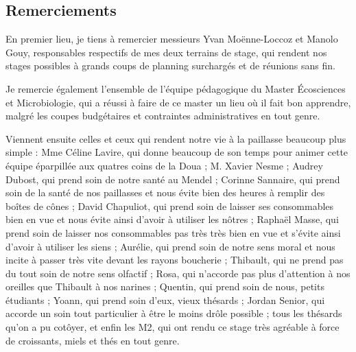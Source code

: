 \rmfamily
{}


\subsection*{Remerciements}


En premier lieu, je tiens à remercier messieurs Yvan Moënne-Loccoz et Manolo
Gouy, responsables respectifs de mes deux terrains de stage, qui rendent nos
stages possibles à grands coups de planning surchargés et de réunions sans fin.

Je remercie également l'ensemble de l'équipe pédagogique du Master Écosciences
et Microbiologie, qui a réussi à faire de ce master un lieu où il fait bon
apprendre, malgré les coupes budgétaires et contraintes administratives en tout
genre.

Viennent ensuite celles et ceux qui rendent notre vie à la paillasse beaucoup
plus simple : Mme Céline Lavire, qui donne beaucoup de son temps pour animer
cette équipe éparpillée aux quatres coins de la Doua ; M. Xavier Nesme ; Audrey
Dubost, qui prend soin de notre santé au Mendel ; Corinne Sannaire, qui prend
soin de la santé de nos paillasses et nous évite bien des heures à remplir des
boîtes de cônes ; David Chapuliot, qui prend soin de laisser ses consommables
bien en vue et nous évite ainsi d'avoir à utiliser les nôtres ; Raphaël Masse,
qui prend soin de laisser nos consommables pas très très bien en vue et s'évite
ainsi d'avoir à utiliser les siens ; Aurélie, qui prend soin de notre sens moral
et nous incite à passer très vite devant les rayons boucherie ; Thibault, qui ne
prend pas du tout soin de notre sens olfactif ; Rosa, qui n'accorde pas plus
d'attention à nos oreilles que Thibault à nos narines ; Quentin, qui prend soin
de nous, petits étudiants ; Yoann, qui prend soin d'eux, vieux thésards ; Jordan
Senior, qui accorde un soin tout particulier à être le moins drôle possible ;
tous les thésards qu'on a pu cotôyer, et enfin les M2, qui ont rendu ce stage
très agréable à force de croissants, miels et thés en tout genre.

